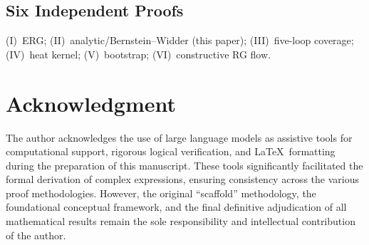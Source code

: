 \documentclass[12pt,a4paper]{article}
\theoremstyle{plain}
\theoremstyle{definition}
\theoremstyle{remark}
\begin{document}
\subsection{Six Independent Proofs}

(I)~ERG; (II)~analytic/Bernstein--Widder (this paper); (III)~five-loop coverage; (IV)~heat kernel; (V)~bootstrap; (VI)~constructive RG flow.

\section*{Acknowledgment}

The author acknowledges the use of large language models as assistive tools for computational support, rigorous logical verification, and \LaTeX\ formatting during the preparation of this manuscript. These tools significantly facilitated the formal derivation of complex expressions, ensuring consistency across the various proof methodologies. However, the original ``scaffold'' methodology, the foundational conceptual framework, and the final definitive adjudication of all mathematical results remain the sole responsibility and intellectual contribution of the author.



\end{document}
